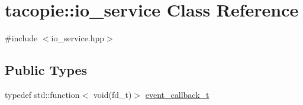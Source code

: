 \hypertarget{classtacopie_1_1io__service}{}\section{tacopie\+:\+:io\+\_\+service Class Reference}
\label{classtacopie_1_1io__service}


{\ttfamily \#include $<$io\+\_\+service.\+hpp$>$}

\subsection*{Public Types}
\begin{DoxyCompactItemize}
\item 
typedef std\+::function$<$ void(fd\+\_\+t)$>$ \hyperlink{classtacopie_1_1io__service_abb66850c32d9c724f4418d77bd04bcfd}{event\+\_\+callback\+\_\+t}
\end{DoxyCompactItemize}
